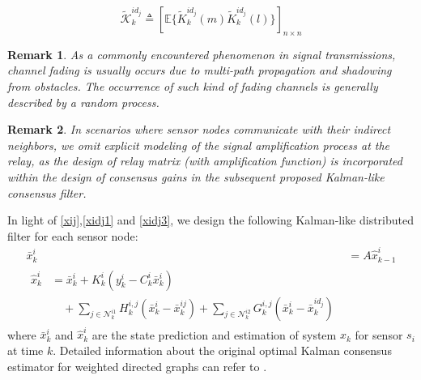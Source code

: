 \documentclass[twocolumn]{IEEEtran}
\newtheorem{remark}{Remark}
\begin{document}
\begin{equation}
\tilde{\mathscr{K}}_{k}^{id_j}\triangleq\left[\mathbb{E}\{\tilde{K}_{k}^{id_j}(m)\tilde{K}_{k}^{id_j}(l)\}\right]_{n\times n}
\end{equation}
\begin{remark}
As a commonly encountered phenomenon in signal transmissions, channel fading is usually occurs due to multi-path propagation and shadowing from obstacles. The occurrence of such kind of fading channels is generally described by a random process. 
\end{remark}
\begin{remark}
In scenarios where sensor nodes communicate with their indirect neighbors, we omit explicit modeling of the signal amplification process at the relay, as the design of relay matrix (with amplification function) is incorporated within the design of consensus gains in the subsequent proposed Kalman-like consensus filter.
\end{remark}
In light of \eqref{xij},\eqref{xidj1} and \eqref{xidj3}, we design the following Kalman-like distributed filter for each sensor node:
\begin{align}
\bar{x}_{k}^{i}&=A\hat{x}_{k-1}^{i} \label{prediction}\\
\begin{split}
\hat{x}_{k}^{i}&=\bar{x}_{k}^{i}+K_{k}^{i}(y_{k}^{i}-C_{k}^{i}\bar{x}_{k}^{i})\\
&
\quad+\sum_{j\in\mathcal{N}_{k}^{i1}}H_{k}^{i,j}(\bar{x}_{k}^{i}-\bar{x}_{k}^{ij})+\sum_{j\in\mathcal{N}_{k}^{i2}}G_{k}^{i,j}(\bar{x}_{k}^{i}-\bar{x}_{k}^{id_j})\label{heart}
\end{split}
\end{align}
where $\bar{x}_{k}^{i}$ and $\hat{x}_{k}^{i}$ are the state prediction and estimation of system $x_k$ for sensor $s_{i}$ at time $k$. Detailed information about the original optimal Kalman consensus estimator for weighted directed graphs can refer to \cite{khan2019optimal}.
\end{document}
